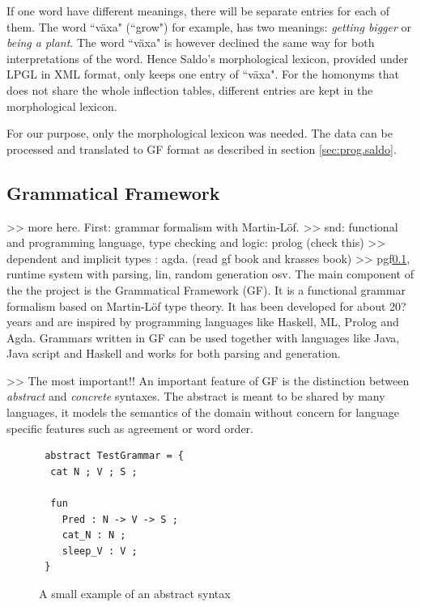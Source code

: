 \documentclass{report}
\begin{document}
If one word
have different meanings, there will be separate entries for each of them.
The word ``växa" (``grow") for example, has two meanings: \emph{getting bigger}
or \emph{being a plant}. 
The word ``växa" is however declined the same way for both interpretations of the word.
Hence Saldo's morphological lexicon, provided under LPGL in XML format,
only keeps one entry of ``växa".
For the homonyms that does not share the whole inflection tables, different entries are 
kept in the morphological lexicon.

For our purpose, only the morphological lexicon was needed.
The data can be processed and translated to GF format as described in 
section \ref{sec:prog.saldo}.

\subsection{Grammatical Framework}
>> more here. First: grammar formalism with Martin-Löf.
>> snd: functional and programming language, type checking and logic: prolog (check this)
>> dependent and implicit types : agda. (read gf book and krasses book)
>> pgf\ref{}, runtime system with parsing, lin, random generation osv.
The main component of the the project is the Grammatical Framework\cite{gfbok} (GF). It is
a functional grammar formalism based on Martin-Löf type theory.
It has been developed for about 20? years and are inspired by programming languages
like Haskell\cite{haskell},
ML\cite{ml}, Prolog\cite{bratko} and
Agda\cite{agda}.
Grammars written in GF can be used together with languages 
like Java, Java script and Haskell and works for both parsing and generation.

>> The most important!!
An important feature of GF is
the distinction between
\textit{abstract} and \textit{concrete} syntaxes. The abstract is meant to be
shared by many languages, it models the semantics of the domain without concern for
language specific features such as agreement or word order.

\begin{figure}[h]
\begin{verbatim}
 abstract TestGrammar = {
  cat N ; V ; S ;

  fun 
    Pred : N -> V -> S ;
    cat_N : N ;
    sleep_V : V ;
 }
\end{verbatim}
\caption{A small example of an abstract syntax}
\label{fig:gfAbstract1}
\end{figure}
\end{document}
